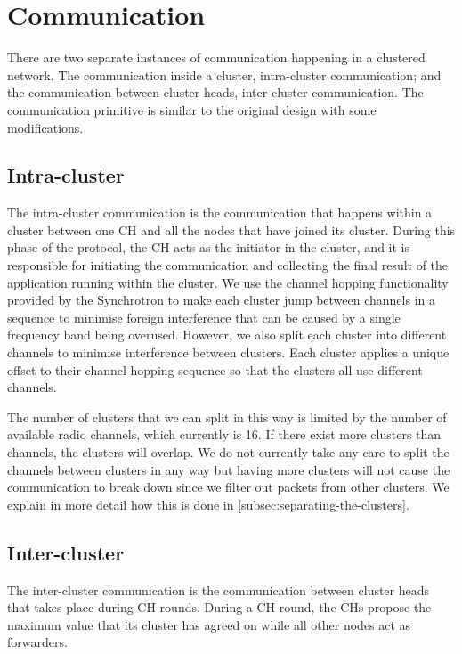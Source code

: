\section{Communication}
There are two separate instances of communication happening in a clustered network. The communication inside a cluster, intra-cluster communication; and the communication between cluster heads, inter-cluster communication. The communication primitive is similar to the original \atwo{} design with some modifications.


\subsection{Intra-cluster}
The intra-cluster communication is the communication that happens within a cluster between one CH and all the nodes that have joined its cluster. During this phase of the protocol, the CH acts as the initiator in the cluster, and it is responsible for initiating the communication and collecting the final result of the application running within the cluster. We use the channel hopping functionality provided by the \atwo{} Synchrotron \cite{a2-introduction-paper} to make each cluster jump between channels in a sequence to minimise foreign interference that can be caused by a single frequency band being overused. However, we also split each cluster into different channels to minimise interference between clusters. Each cluster applies a unique offset to their channel hopping sequence so that the clusters all use different channels.

The number of clusters that we can split in this way is limited by the number of available radio channels, which currently is 16. If there exist more clusters than channels, the clusters will overlap. We do not currently take any care to split the channels between clusters in any way but having more clusters will not cause the communication to break down since we filter out packets from other clusters. We explain in more detail how this is done in \cref{subsec:separating-the-clusters}.


\subsection{Inter-cluster}
The inter-cluster communication is the communication between cluster heads that takes place during CH rounds. During a CH round, the CHs propose the maximum value that its cluster has agreed on while all other nodes act as forwarders.

